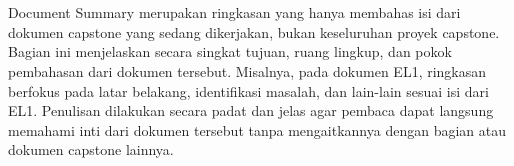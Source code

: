 \documentclass{elsinta}
\begin{document}
\coverpage
\newpage




\clearpage
{}
\setcounter{page}{1} 
\pagestyle{myfooter} %


\tableofcontents
\newpage
\section*{\docsumary}
Document Summary merupakan ringkasan yang hanya membahas isi dari dokumen capstone yang sedang dikerjakan, bukan keseluruhan proyek capstone. Bagian ini menjelaskan secara singkat tujuan, ruang lingkup, dan pokok pembahasan dari dokumen tersebut. Misalnya, pada dokumen EL1, ringkasan berfokus pada latar belakang, identifikasi masalah, dan lain-lain sesuai isi dari EL1.  Penulisan dilakukan secara padat dan jelas agar pembaca dapat langsung memahami inti dari dokumen tersebut tanpa mengaitkannya dengan bagian atau dokumen capstone lainnya.
\newpage

\section{\ProjectBenchmarkTitle}

\subsection{\PrevProjectsTitle}
\end{document}
